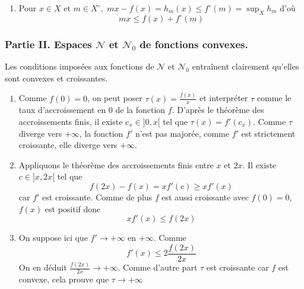 \begin{enumerate}
\item  Pour $x\in X$ et $m\in X^{\circ },$ $mx-f(x)=h_{m}(x)\leq f^{\circ
}(m)=\sup_{X}h_{m}$ d'o\`{u}
\[
mx\leq f(x)+f^{\circ }(m)
\]

\end{enumerate}

\subsubsection*{Partie II. Espaces $\mathcal{N}$ et $\mathcal{N}_0$ de fonctions convexes.}
Les conditions imposées aux fonctions de $\mathcal{N}$ et $\mathcal{N}_0$ entraînent clairement qu'elles sont convexes et croissantes.
\begin{enumerate}
\item Comme $f(0)=0$, on peut poser $\tau(x)=\frac{f(x)}{x}$ et interpréter $\tau$ comme le taux d'accroissement en 0 de la fonction $f$. D'après le théorème des accroissements finis, il existe $c_x \in ]0,x[$ tel que $\tau(x)=f'(c_x)$. Comme $\tau$ diverge vers $+\infty$, la fonction $f'$ n'est pas majorée, comme $f'$ est strictement croissante, elle diverge vers $+\infty$.
\item Appliquons le théorème des accroissements finis entre $x$ et $2x$. Il existe $c\in]x,2x[$ tel que
\[f(2x)-f(x)=xf'(c)\geq xf'(x)\]
car $f'$ est croissante. Comme de plus $f$ est aussi croissante avec $f(0)=0$, $f(x)$ est positif donc
\[xf'(x)\leq f(2x)\]
\item On suppose ici que $f'\rightarrow +\infty$ en $+\infty$. Comme
\[f'(x)\leq 2 \frac{f(2x)}{2x}\]
On en déduit $\frac{f(2x)}{2x}\rightarrow +\infty$. Comme d'autre part $\tau$ est croissante car $f$ est convexe, cela prouve que $\tau \rightarrow +\infty$
\end{enumerate}


